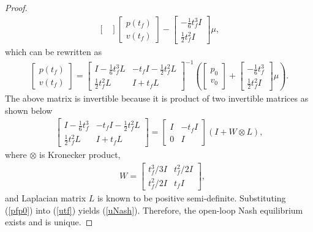 \documentclass[12pt,draftcls,onecolumn]{IEEEtran}  %
\begin{document}
{\begin{proof}
\begin{align}
\begin{bmatrix}
\end{bmatrix}
\begin{bmatrix}
p(t_f)\\
v(t_f)
\end{bmatrix}-\begin{bmatrix}
-\frac{1}{6}t_f^3I\\ \frac{1}{2}t_f^2I
\end{bmatrix}\mu,\label{p0pf}
\end{align}
which can be rewritten as
\begin{align}
\begin{bmatrix}
p(t_f)\\
v(t_f)
\end{bmatrix}=\begin{bmatrix}
I-\frac{1}{6}t_f^3L&-t_fI-\frac{1}{2}t_f^2L\\
\frac{1}{2}t_f^2L&I+t_fL
\end{bmatrix}^{-1}\left(
\begin{bmatrix}
p_0\\
v_0
\end{bmatrix}+\begin{bmatrix}
-\frac{1}{6}t_f^3\\ \frac{1}{2}t_f^2I
\end{bmatrix}\mu\right)\label{pfp0}.
\end{align}
The above matrix is invertible because it is product of two invertible matrices as shown below
\begin{align}
\begin{bmatrix}
I-\frac{1}{6}t_f^3&-t_fI-\frac{1}{2}t_f^2L\\
\frac{1}{2}t_f^2L&I+t_fL
\end{bmatrix}=\begin{bmatrix}
I&-t_fI\\
0&I
\end{bmatrix}\left(I+W\otimes L\right),\label{matrixdecompose}
\end{align}
where $\otimes$ is Kronecker product,
\begin{align}
&W=\begin{bmatrix}
t_f^3/3I&t_f^2/2I\\
t_f^2/2I&t_fI
\end{bmatrix}\label{W},
\end{align}
and Laplacian matrix $L$ is known to be positive semi-definite. Substituting (\ref{pfp0}) into (\ref{utf}) yields (\ref{uNash}). Therefore, the open-loop Nash equilibrium exists and is unique.
\end{proof}

}
\end{document}
